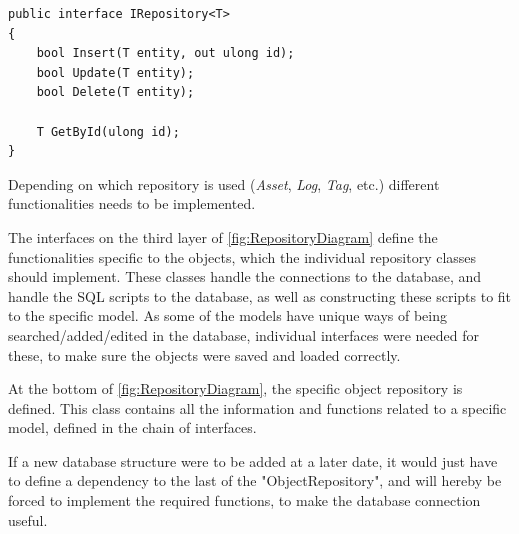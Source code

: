\begin{listing}[H]
\begin{verbatim}
public interface IRepository<T>
{
    bool Insert(T entity, out ulong id);
    bool Update(T entity);
    bool Delete(T entity);

    T GetById(ulong id);
}

\end{verbatim}
\label{code:IRepository}
\end{listing}
\par
Depending on which repository is used (\textit{Asset}, \textit{Log}, \textit{Tag}, etc.) different functionalities needs to be implemented. 
\par
The interfaces on the third layer of \autoref{fig:RepositoryDiagram} define the functionalities specific to the objects, which the individual repository classes should implement. These classes handle the connections to the database, and handle the SQL scripts to the database, as well as constructing these scripts to fit to the specific model. As some of the models have unique ways of being searched/added/edited in the database, individual interfaces were needed for these, to make sure the objects were saved and loaded correctly. 
\par
At the bottom of \autoref{fig:RepositoryDiagram}, the specific object repository is defined. This class contains all the information and functions related to a specific model, defined in the chain of interfaces.
\par
If a new database structure were to be added at a later date, it would just have to define a dependency to the last of the "ObjectRepository", and will hereby be forced to implement the required functions, to make the database connection useful.
